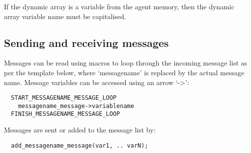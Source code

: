 If the dynamic array is a variable from the agent memory, then the dynamic
array variable name must be capitalised.

\subsection{Sending and receiving messages}

Messages can be read using macros to loop through the incoming message list as
per the template below, where `messagename' is replaced by the actual message
name. Message variables can be accessed using an arrow `->':

\begin{verbatim}
  START_MESSAGENAME_MESSAGE_LOOP
    messagename_message->variablename
  FINISH_MESSAGENAME_MESSAGE_LOOP
\end{verbatim}

Messages are sent or added to the message list by:

\begin{verbatim}
  add_messagename_message(var1, .. varN);
\end{verbatim}
